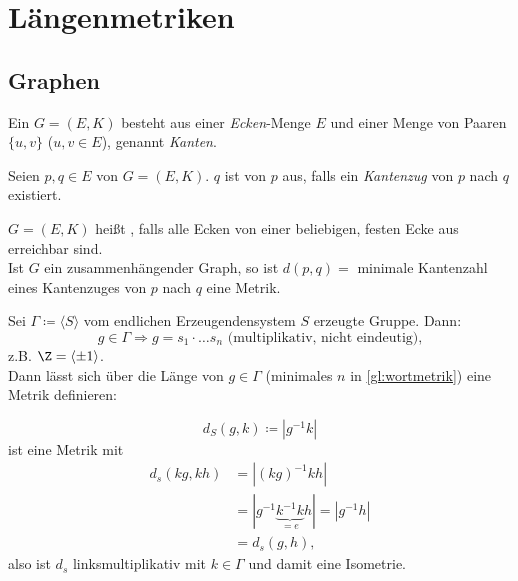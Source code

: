 \chapter{Längenmetriken}

\section{Graphen}

\begin{definition}[Graph]\label{def:graph}
  Ein  \( G = (E, K) \) besteht aus einer \emph{Ecken}-Menge \( E \) und einer Menge von Paaren \( \{ u, v \} \) (\( u, v \in E \)), genannt \emph{Kanten}.
\end{definition}

\begin{definition}[Erreichbarkeit]
  Seien \( p, q \in E \) von \( G = (E, K) \). \( q \) ist  von \( p \) aus, falls ein \emph{Kantenzug} von \( p \) nach \( q \) existiert.
\end{definition}

\begin{definition}[Zusammenhängend]
  \( G = (E, K) \) heißt , falls alle Ecken von einer beliebigen, festen Ecke aus erreichbar sind.
  \\
  Ist \( G \) ein zusammenhängender Graph, so ist \( d(p, q) = \) minimale Kantenzahl eines Kantenzuges von \( p \) nach \( q \) eine Metrik.
\end{definition}

\begin{example}[Wortmetrik]
  Sei \( \Gamma \coloneqq \langle S \rangle \) vom endlichen Erzeugendensystem \( S \) erzeugte Gruppe. Dann:
  \begin{equation}
    \label{gl:wortmetrik}
    g \in \Gamma \Rightarrow g = s_1\cdot \dots s_n\text{ (multiplikativ, nicht eindeutig),}
  \end{equation}
  z.B. \( \Z = \langle \pm 1 \rangle \). \\
  Dann lässt sich über die Länge von \( g \in \Gamma \) (minimales \( n \) in \autoref{gl:wortmetrik}) eine Metrik definieren:
\end{example}

\begin{definition}[Wortmetrik]\label{def:wortmetrik}
  \begin{equation*}
    d_S(g, k) \coloneqq |g^{-1}k|
  \end{equation*}
  ist eine Metrik mit
  \begin{align*}
    d_s(kg,kh) &= |{(kg)}^{-1}kh| \\ 
    &= |g^{-1}\underbrace{k^{-1}k}_{=e}h| = |g^{-1}h| \\
    &= d_s(g,h)\text{,}
  \end{align*}
  also ist \( d_s \) linksmultiplikativ mit \( k \in \Gamma \) und damit eine Isometrie.
\end{definition}

